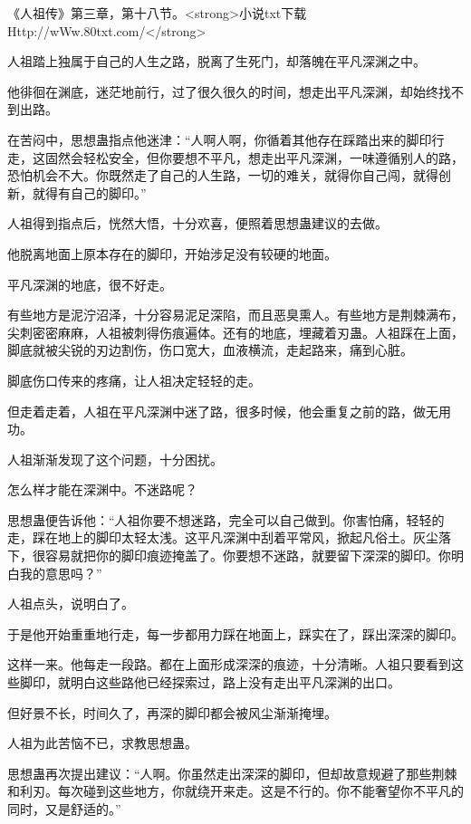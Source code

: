 
\begin{this_body}

《人祖传》第三章，第十八节。<strong>小说txt下载Http://wWw.80txt.com/</strong>

人祖踏上独属于自己的人生之路，脱离了生死门，却落魄在平凡深渊之中。

他徘徊在渊底，迷茫地前行，过了很久很久的时间，想走出平凡深渊，却始终找不到出路。

在苦闷中，思想蛊指点他迷津：“人啊人啊，你循着其他存在踩踏出来的脚印行走，这固然会轻松安全，但你要想不平凡，想走出平凡深渊，一味遵循别人的路，恐怕机会不大。你既然走了自己的人生路，一切的难关，就得你自己闯，就得创新，就得有自己的脚印。”

人祖得到指点后，恍然大悟，十分欢喜，便照着思想蛊建议的去做。

他脱离地面上原本存在的脚印，开始涉足没有较硬的地面。

平凡深渊的地底，很不好走。

有些地方是泥泞沼泽，十分容易泥足深陷，而且恶臭熏人。有些地方是荆棘满布，尖刺密密麻麻，人祖被刺得伤痕遍体。还有的地底，埋藏着刃蛊。人祖踩在上面，脚底就被尖锐的刃边割伤，伤口宽大，血液横流，走起路来，痛到心脏。

脚底伤口传来的疼痛，让人祖决定轻轻的走。

但走着走着，人祖在平凡深渊中迷了路，很多时候，他会重复之前的路，做无用功。

人祖渐渐发现了这个问题，十分困扰。

怎么样才能在深渊中。不迷路呢？

思想蛊便告诉他：“人祖你要不想迷路，完全可以自己做到。你害怕痛，轻轻的走，踩在地上的脚印太轻太浅。这平凡深渊中刮着平常风，掀起凡俗土。灰尘落下，很容易就把你的脚印痕迹掩盖了。你要想不迷路，就要留下深深的脚印。你明白我的意思吗？”

人祖点头，说明白了。

于是他开始重重地行走，每一步都用力踩在地面上，踩实在了，踩出深深的脚印。

这样一来。他每走一段路。都在上面形成深深的痕迹，十分清晰。人祖只要看到这些脚印，就明白这些路他已经探索过，路上没有走出平凡深渊的出口。

但好景不长，时间久了，再深的脚印都会被风尘渐渐掩埋。

人祖为此苦恼不已，求教思想蛊。

思想蛊再次提出建议：“人啊。你虽然走出深深的脚印，但却故意规避了那些荆棘和利刃。每次碰到这些地方，你就绕开来走。这是不行的。你不能奢望你不平凡的同时，又是舒适的。”


\end{this_body}
